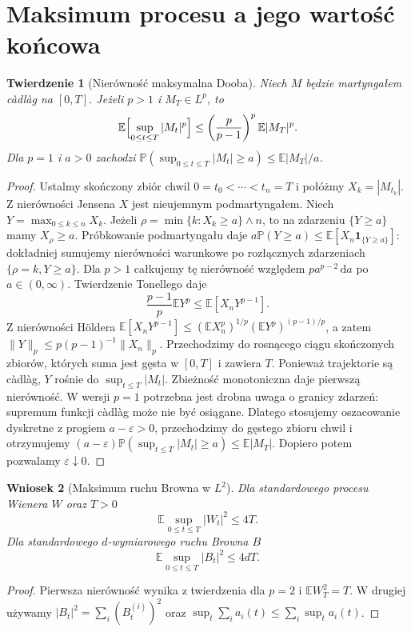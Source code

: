 \documentclass[11pt,a4paper,oneside]{report}
\numberwithin{equation}{chapter}
\theoremstyle{plain}
\newtheorem{twierdzenie}{Twierdzenie}[chapter]
\newtheorem{wniosek}[twierdzenie]{Wniosek}
\theoremstyle{definition}
\theoremstyle{remark}
\newcommand{\Prob}{\mathbb{P}}
\newcommand{\E}{\mathbb{E}}
\newcommand{\ind}[1]{\mathbf{1}_{#1}}
\newcommand{\dd}{\mathrm{d}}
\begin{document}
\section{Maksimum procesu a jego wartość końcowa}
\begin{twierdzenie}[Nierówność maksymalna Dooba]
\label{thm:doob-cont}
Niech $M$ będzie martyngałem c\`adl\`ag na $[0,T]$.
Jeżeli $p>1$ i $M_T\in L^p$, to
\[
\E\Bigl[\sup_{0\le t\le T}|M_t|^p\Bigr]
\le\left(\frac{p}{p-1}\right)^p\E|M_T|^p.
\]
Dla $p=1$ i $a>0$ zachodzi
$\Prob(\sup_{0\le t\le T}|M_t|\ge a)
\le\E|M_T|/a$.
\end{twierdzenie}
\begin{proof}
Ustalmy skończony zbiór chwil
$0=t_0<\cdots<t_n=T$ i połóżmy $X_k=|M_{t_k}|$.
Z nierówności Jensena $X$ jest nieujemnym podmartyngałem.
Niech $Y=\max_{0\le k\le n}X_k$.
Jeżeli $\rho=\min\{k:X_k\ge a\}\wedge n$,
to na zdarzeniu $\{Y\ge a\}$ mamy $X_\rho\ge a$.
Próbkowanie podmartyngału daje
$a\Prob(Y\ge a)\le\E[X_n\ind{\{Y\ge a\}}]$:
dokładniej sumujemy nierówności warunkowe po rozłącznych
zdarzeniach $\{\rho=k,Y\ge a\}$.
Dla $p>1$ całkujemy tę nierówność względem
$p a^{p-2}\,\dd a$ po $a\in(0,\infty)$.
Twierdzenie Tonellego daje
\[
\frac{p-1}{p}\E Y^p
\le\E[X_nY^{p-1}].
\]
Z nierówności H\"oldera
$\E[X_nY^{p-1}]\le
(\E X_n^p)^{1/p}(\E Y^p)^{(p-1)/p}$,
a zatem $\|Y\|_p\le p(p-1)^{-1}\|X_n\|_p$.
Przechodzimy do rosnącego ciągu skończonych zbiorów,
których suma jest gęsta w $[0,T]$ i zawiera $T$.
Ponieważ trajektorie są c\`adl\`ag,
$Y$ rośnie do $\sup_{t\le T}|M_t|$.
Zbieżność monotoniczna daje pierwszą nierówność.
W wersji $p=1$ potrzebna jest drobna uwaga o granicy
zdarzeń: supremum funkcji c\`adl\`ag może nie być
osiągane. Dlatego stosujemy oszacowanie dyskretne
z progiem $a-\varepsilon>0$, przechodzimy do gęstego
zbioru chwil i otrzymujemy
$(a-\varepsilon)\Prob(\sup_{t\le T}|M_t|\ge a)
\le\E|M_T|$.
Dopiero potem pozwalamy $\varepsilon\downarrow0$.
\end{proof}

\begin{wniosek}[Maksimum ruchu Browna w $L^2$]
Dla standardowego procesu Wienera $W$ oraz $T>0$
\[
\E\sup_{0\le t\le T}|W_t|^2\le4T.
\]
Dla standardowego $d$-wymiarowego ruchu Browna $B$
\[
\E\sup_{0\le t\le T}|B_t|^2\le4dT.
\]
\end{wniosek}
\begin{proof}
Pierwsza nierówność wynika z twierdzenia dla $p=2$
i $\E W_T^2=T$. W drugiej używamy
$|B_t|^2=\sum_i(B_t^{(i)})^2$ oraz
$\sup_t\sum_i a_i(t)\le\sum_i\sup_t a_i(t)$.
\end{proof}
\end{document}
